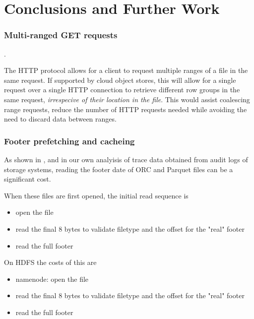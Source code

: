 \documentclass[manuscript]{acmart}
\begin{document}
\section{Conclusions and Further Work}
\label{sec:conclusions}

\subsubsection{Multi-ranged GET requests}.

The HTTP protocol allows for a client to request multiple ranges of a file
in the same request.
If supported by cloud object stores, this will allow for a single request
over a single HTTP connection to retrieve different row groups in the same
request, \emph{irrespecive of their location in the file}.
This would assist coalescing range requests, reduce the number of HTTP requests
needed while avoiding the need to discard data between ranges.

\subsubsection{Footer prefetching and cacheing}

As shown in \cite{zeng2023empirical}, and in our own analyisis of trace data
obtained from audit logs of storage systems, reading the footer date of ORC and Parquet
files can be a significant cost.

When these files are first opened, the initial read sequence is

\begin{itemize}
  \item{open the file}
  \item{read the final 8 bytes to validate filetype and the offset for the "real" footer}
  \item{read the full footer}
\end{itemize}

On HDFS the costs of this are
\begin{itemize}
  \item{namenode: open the file}
  \item{read the final 8 bytes to validate filetype and the offset for the "real" footer}
  \item{read the full footer}
\end{itemize}






\end{document}
